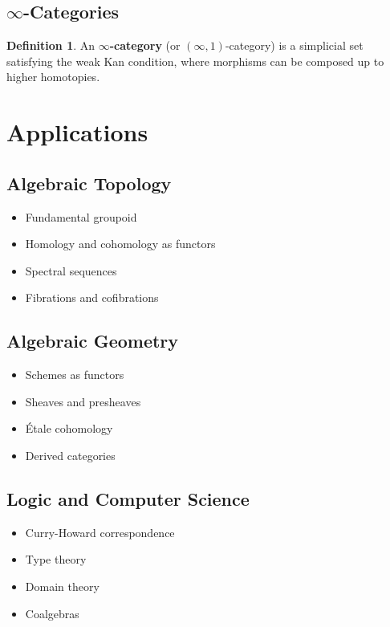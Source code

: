 \documentclass[11pt]{article}
\theoremstyle{definition}
\newtheorem{definition}{Definition}[section]
\begin{document}
\subsection{$\infty$-Categories}
\begin{definition}
An \textbf{$\infty$-category} (or $(\infty,1)$-category) is a simplicial set satisfying the weak Kan condition, where morphisms can be composed up to higher homotopies.
\end{definition}

\section{Applications}

\subsection{Algebraic Topology}
\begin{itemize}
    \item Fundamental groupoid
    \item Homology and cohomology as functors
    \item Spectral sequences
    \item Fibrations and cofibrations
\end{itemize}

\subsection{Algebraic Geometry}
\begin{itemize}
    \item Schemes as functors
    \item Sheaves and presheaves
    \item Étale cohomology
    \item Derived categories
\end{itemize}

\subsection{Logic and Computer Science}
\begin{itemize}
    \item Curry-Howard correspondence
    \item Type theory
    \item Domain theory
    \item Coalgebras
\end{itemize}
\end{document}
